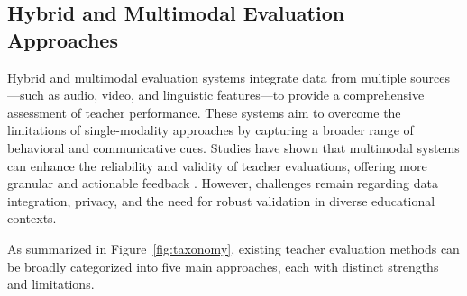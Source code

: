 \subsection{Hybrid and Multimodal Evaluation Approaches}
Hybrid and multimodal evaluation systems integrate data from multiple sources—such as audio, video, and linguistic features—to provide a comprehensive assessment of teacher performance. These systems aim to overcome the limitations of single-modality approaches by capturing a broader range of behavioral and communicative cues. Studies have shown that multimodal systems can enhance the reliability and validity of teacher evaluations, offering more granular and actionable feedback \cite{Ginsburg2022NecessaryBI, 10.1007/978-981-99-9109-9_7, hou2024encouragement}. However, challenges remain regarding data integration, privacy, and the need for robust validation in diverse educational contexts.



As summarized in Figure~\ref{fig:taxonomy}, existing teacher evaluation methods can be broadly categorized into five main approaches, each with distinct strengths and limitations.
